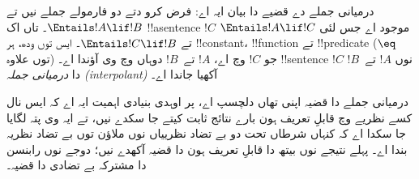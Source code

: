 \documentclass[../../../include/open-logic-section]{subfiles}
\begin{document}


درمیانی جملے دے قضیے دا بیان ایہ اے: فرض کرو دتے دو
فارمولے جملے نیں تے
$\Entails !A \lif !B$۔ تاں اک !!a{sentence} $!C$
موجود اے جس لئی $\Entails !A \lif !C$ تے
$\Entails !C \lif !B$۔ ایس توں ودھ، ہر
!!{constant}، !!{function} تے !!{predicate}
($\eq$ توں علاوہ) جو $!C$ وچ اے، $!A$
تے~$!B$ دوہاں وچ وی آؤندا اے۔
!!{sentence} $!C$ نوں
$!A$ تے~$!B$ دا \emph{درمیانی جملہ
(interpolant)} آکھیا جاندا اے۔

درمیانی جملے دا قضیہ اپنی تھاں دلچسپ اے، پر
اوہدی بنیادی اہمیت ایہ اے کہ ایس نال کسے نظریے
وچ قابلِ تعریف ہون بارے نتائج ثابت کیتے جا سکدے
نیں، تے ایہ وی پتہ لگایا جا سکدا اے کہ کنہاں
شرطاں تحت دو بے تضاد نظرییاں نوں ملاؤن توں
بے تضاد نظریہ بندا اے۔ پہلے نتیجے نوں بیتھ دا
قابلِ تعریف ہون دا قضیہ آکھدے نیں؛ دوجے نوں
رابنسن دا مشترکہ بے تضادی دا قضیہ۔
\end{document}
